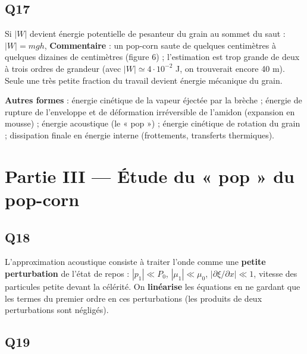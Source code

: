 \documentclass[11pt,a4paper]{article}
\newcommand{\equationajustee}[1]{%
  \sbox{\boiteequation}{$\displaystyle #1$}%
  \ifdim\wd\boiteequation>\linewidth
    \[\resizebox{\linewidth}{!}{\usebox{\boiteequation}}\]%
  \else
    \[#1\]%
  \fi}
\begin{document}
\hypertarget{q17}{%
\subsection{Q17}\label{q17}}

Si \(|W|\) devient énergie potentielle de pesanteur du grain au sommet du saut : \(|W|=mgh\),
\equationajustee{\begin{aligned}
h&=\frac{|W|}{mg}\\
&=\frac{1{,}4\cdot10^{-1}}{1\cdot10^{-4}\times10}
\end{aligned}}
\equationajustee{\boxed{h\simeq1{,}4\cdot10^2\ \mathrm m}}
\textbf{Commentaire} : un pop-corn saute de quelques centimètres à quelques dizaines de centimètres (figure 6) ; l'estimation est trop grande de deux à trois ordres de grandeur (avec \(|W|\simeq4\cdot10^{-2}\) J, on trouverait encore 40 m). Seule une très petite fraction du travail devient énergie mécanique du grain.

\textbf{Autres formes} : énergie cinétique de la vapeur éjectée par la brèche ; énergie de rupture de l'enveloppe et de déformation irréversible de l'amidon (expansion en mousse) ; énergie acoustique (le « pop ») ; énergie cinétique de rotation du grain ; dissipation finale en énergie interne (frottements, transferts thermiques).

\hypertarget{partie-iii-uxe9tude-du-pop-du-pop-corn}{%
\section{Partie III --- Étude du « pop » du pop-corn}\label{partie-iii-uxe9tude-du-pop-du-pop-corn}}

\hypertarget{q18}{%
\subsection{Q18}\label{q18}}

L'approximation acoustique consiste à traiter l'onde comme une \textbf{petite perturbation} de l'état de repos : \(|p_1|\ll P_0\), \(|\mu_1|\ll\mu_0\), \(|\partial\xi/\partial x|\ll1\), vitesse des particules petite devant la célérité. On \textbf{linéarise} les équations en ne gardant que les termes du premier ordre en ces perturbations (les produits de deux perturbations sont négligés).

\hypertarget{q19}{%
\subsection{Q19}\label{q19}}
\end{document}
